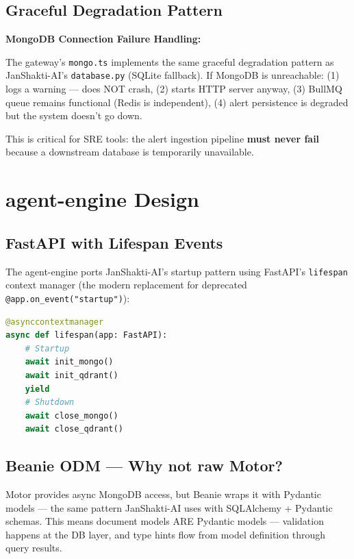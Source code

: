 \documentclass[11pt,a4paper]{article}
\begin{document}
\subsection{Graceful Degradation Pattern}

\begin{techbox}
\textbf{MongoDB Connection Failure Handling:}

The gateway's \texttt{mongo.ts} implements the same graceful degradation pattern as JanShakti-AI's
\texttt{database.py} (SQLite fallback). If MongoDB is unreachable: (1) logs a warning — does NOT crash, (2) starts HTTP server anyway, (3) BullMQ queue remains functional (Redis is independent), (4) alert persistence is degraded but the system doesn't go down.

This is critical for SRE tools: the alert ingestion pipeline \textbf{must never fail}
because a downstream database is temporarily unavailable.
\end{techbox}

\section{agent-engine Design}

\subsection{FastAPI with Lifespan Events}

The agent-engine ports JanShakti-AI's startup pattern using FastAPI's \texttt{lifespan}
context manager (the modern replacement for deprecated \texttt{@app.on\_event("startup")}):

\begin{lstlisting}[language=Python, caption=FastAPI lifespan pattern]
@asynccontextmanager
async def lifespan(app: FastAPI):
    # Startup
    await init_mongo()
    await init_qdrant()
    yield
    # Shutdown
    await close_mongo()
    await close_qdrant()
\end{lstlisting}

\subsection{Beanie ODM — Why not raw Motor?}

\begin{decisionbox}
Motor provides async MongoDB access, but Beanie wraps it with Pydantic models —
the same pattern JanShakti-AI uses with SQLAlchemy + Pydantic schemas. This means
document models ARE Pydantic models — validation happens at the DB layer, and type
hints flow from model definition through query results.
\end{decisionbox}
\end{document}
